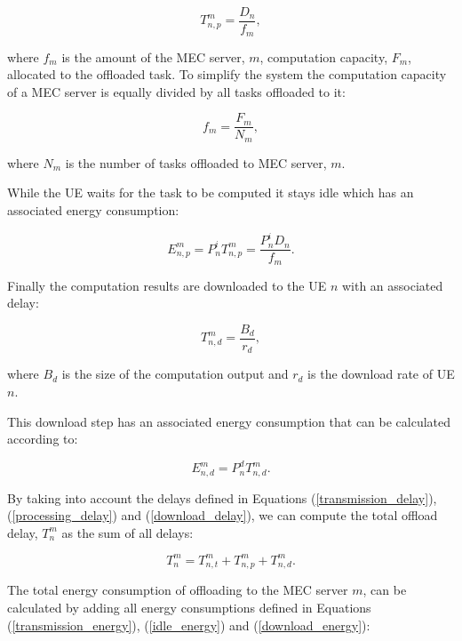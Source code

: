 \documentclass[conference]{IEEEtran}
\begin{document}
\begin{equation} \label{processing_delay}
    T_{n,p}^m = \frac{D_n}{f_m} ,
\end{equation}

where $f_m$ is the amount of the \acrshort{MEC} server, $m$, computation capacity, $F_m$, allocated to the offloaded task. To simplify the system the computation capacity of a \acrshort{MEC} server is equally divided by all tasks offloaded to it:

\begin{equation}
    f_m = \frac{F_m}{N_m},
\end{equation}

where $N_m$ is the number of tasks offloaded to \acrshort{MEC} server, $m$.

While the \acrshort{UE} waits for the task to be computed it stays idle which has an associated energy consumption:

\begin{equation} \label{idle_energy}
    E_{n,p}^m = P_n^i T_{n,p}^m = \frac{P_n^i D_n}{f_m}.
\end{equation}

Finally the computation results are downloaded to the \acrshort{UE} $n$ with an associated delay:

\begin{equation} \label{download_delay}
    T_{n, d}^m = \frac{B_d}{r_d},
\end{equation}

where $B_d$ is the size of the computation output and $r_d$ is the download rate of \acrshort{UE} $n$.

This download step has an associated energy consumption that can be calculated according to:

\begin{equation} \label{download_energy}
    E_{n, d}^m = P_n^d T_{n, d}^m .
\end{equation}

By taking into account the delays defined in Equations (\ref{transmission_delay}), (\ref{processing_delay}) and (\ref{download_delay}), we can compute the total offload delay, $T_n^m$ as the sum of all delays:

\begin{equation}
    T_n^m = T_{n,t}^m + T_{n,p}^m + T_{n, d}^m .
\end{equation}

The total energy consumption of offloading to the \acrshort{MEC} server $m$, can be calculated by adding all energy consumptions defined in Equations (\ref{transmission_energy}), (\ref{idle_energy}) and (\ref{download_energy}):
\end{document}
